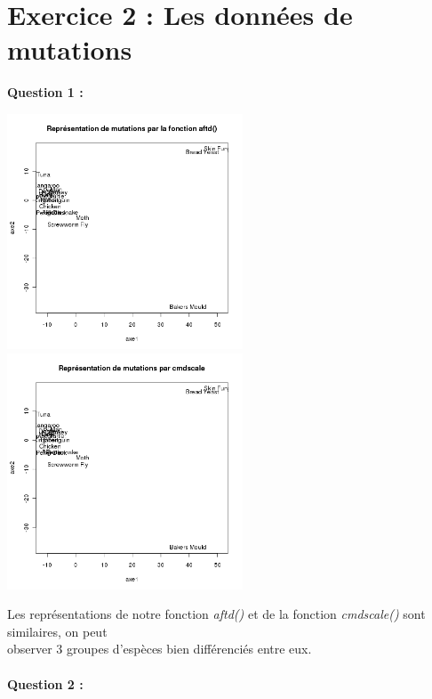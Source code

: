 \documentclass[a4paper, 10pt]{article}
\begin{document}
\section*{Exercice 2 : Les données de mutations}
\textbf{Question 1 :}
\begin{center}
\includegraphics[height = 7cm, width = 7cm]{plots/plot_mutations_aftd.png}
\includegraphics[height = 7cm, width = 7cm]{plots/plot_mutations_cmdscale.png}
\end{center}
Les représentations de notre fonction \textit{aftd()} et de la fonction \textit{cmdscale()} sont similaires,
on peut\\observer 3 groupes d'espèces bien différenciés entre eux.\\ \\
\textbf{Question 2 :}
\end{document}
